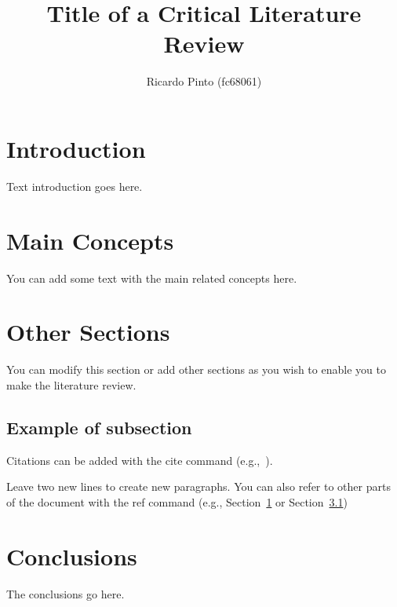 \documentclass[twocolumn,10pt]{article}
\begin{document}
\title{Title of a Critical Literature Review}

\author{Ricardo Pinto (fc68061)}
\date{}
\maketitle

\section{Introduction}
\label{sec:intro}

Text introduction goes here.

\section{Main Concepts}
\label{sec:concepts}

You can add some text with the main related concepts here.

\section{Other Sections}
\label{sec:other}

You can modify this section or add other sections as you wish to enable you to make the literature review.

\subsection{Example of subsection}
\label{sec:example}

Citations can be added with the cite command (e.g.,~\cite{zhang2025dealing}).

Leave two new lines to create new paragraphs.
You can also refer to other parts of the document with the ref command (e.g., Section~\ref{sec:intro} or Section~\ref{sec:example})

\section{Conclusions}
\label{sec:conclusions}

The conclusions go here.




\end{document}

